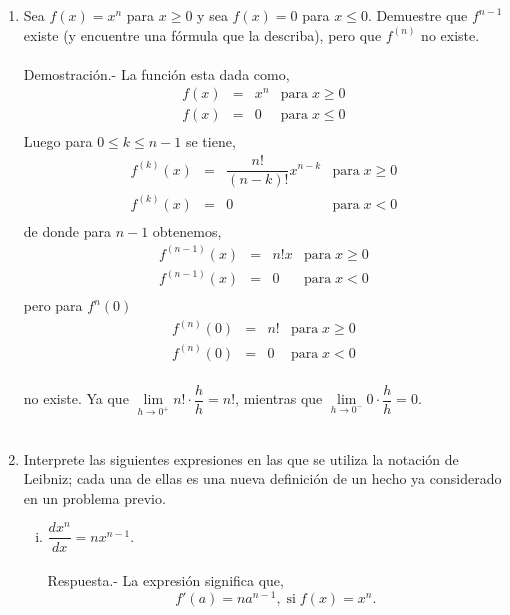 \begin{enumerate}[\bfseries 1]
    \item Sea $f(x)=x^n$ para $x\geq 0$ y sea $f(x)=0$ para $x\leq 0$. Demuestre que $f^{n-1}$ existe (y encuentre una fórmula que la describa), pero que $f^{(n)}$ no existe.\\\\
	Demostración.-\; La función esta dada como, 
	$$\begin{array}{rcll}
	    f(x)&=&x^n& \mbox{para}\;x\geq 0 \\
	    f(x)&=&0& \mbox{para}\;x\leq 0 \\
	\end{array}$$
	Luego para $0\leq k\leq n-1$ se tiene,
	$$\begin{array}{rcll}
	    f^{(k)}(x)&=&\dfrac{n!}{(n-k)!}x^{n-k}& \mbox{para}\;x\geq 0 \\
	    f^{(k)}(x)&=&0& \mbox{para}\;x< 0 \\
	\end{array}$$
	de donde para $n-1$ obtenemos,
	$$\begin{array}{rcll}
	    f^{(n-1)}(x)&=&n!x& \mbox{para}\;x\geq 0 \\
	    f^{(n-1)}(x)&=&0& \mbox{para}\;x<0\\
	\end{array}$$
	pero para $f^n(0)$  
	$$\begin{array}{rcll}
	    f^{(n)}(0)&=&n!& \mbox{para}\;x\geq 0 \\
	    f^{(n)}(0)&=&0& \mbox{para}\;x<0\\
	\end{array}$$

	no existe. Ya que $\lim\limits_{h\to 0^+}n!\cdot \dfrac{h}{h}=n!$, mientras que $\lim\limits_{h\to 0^-}0\cdot \dfrac{h}{h}=0$.\\\\


    \item Interprete las siguientes expresiones en las que se utiliza la notación de Leibniz; cada una de ellas es una nueva definición de un hecho ya considerado en un problema previo.

	\begin{enumerate}[(i)]

	    \item $\dfrac{dx^n}{dx}=nx^{n-1}$.\\\\
		Respuesta.-\; La expresión significa que,
		$$f'(a)=na^{n-1},\; \mbox{si}\; f(x)=x^n.$$\\


\end{enumerate}
\end{enumerate}
